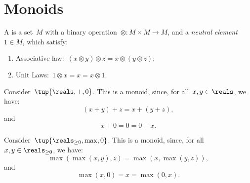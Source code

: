 

\section{Monoids}\label{sec:parallelism-monoids}


\begin{definition}[Monoid]\label{def:monoid}
    A  is a set~$M$ with a binary operation~$\otimes \colon M\times M\to M$, and a \emph{neutral element}~$1\in M$, which satisfy:
    \begin{enumerate}
        \item Associative law:~$(x\otimes y)\otimes z=x\otimes (y\otimes z)$;
        \item Unit Laws:~$1\otimes x=x=x\otimes 1$.
    \end{enumerate}
\end{definition}
\begin{example}
    Consider~$\tup{\reals,+,0}$. This is a monoid, since, for all~$x,y\in \reals$, we have:
    \begin{equation*}
    (x+y)
        +z=x+(y+z),
    \end{equation*}
    and
    \begin{equation*}
        x+0=0=0+x.
    \end{equation*}
\end{example}

\begin{example}
    Consider~$\tup{\reals_{\geq0},\max,0}$. This is a monoid, since, for all~$x,y\in \reals_{\geq0}$, we have:
    \begin{equation*}
        \max(\max(x,y),z)=\max(x,\max(y,z)),
    \end{equation*}
    and
    \begin{equation*}
        \max(x,0)=x=\max(0,x).
    \end{equation*}
\end{example}

